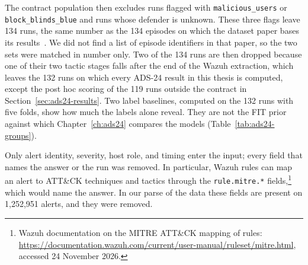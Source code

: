 The contract population then excludes runs flagged with
\texttt{malicious\_users} or \texttt{block\_blinds\_blue} and runs whose
defender is unknown. These three flags leave 134 runs, the same number
as the 134 episodes on which the dataset paper bases its
results~\cite{nyberg2026cyber}. We did not find a list of episode
identifiers in that paper, so the two sets were matched in number only.
Two of the 134 runs are then dropped because one of their two
tactic stages falls after the end of the Wazuh extraction, which leaves
the 132 runs on which every ADS-24 result in this thesis is computed,
except the post hoc scoring of the 119 runs outside the contract in
Section~\ref{sec:ads24-results}.
Two label baselines, computed on the 132 runs with five folds, show how
much the labels alone reveal. They are not the FIT prior against which
Chapter~\ref{ch:ads24} compares the models
(Table~\ref{tab:ads24-groups}).

Only alert identity, severity, host role, and timing enter the input;
every field that names the answer or the run was removed. In particular, Wazuh rules can map an alert to
ATT\&CK techniques and tactics through the \texttt{rule.mitre.*}
fields,\footnote{Wazuh documentation on the MITRE ATT\&CK mapping of
rules: \url{https://documentation.wazuh.com/current/user-manual/ruleset/mitre.html},
accessed 24 November 2026.}
which would name the answer. In our parse of
the data these fields are present on 1,252,951 alerts, and they were
removed.

